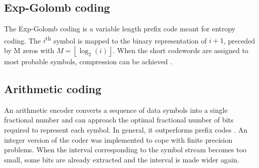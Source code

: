 \subsection{Exp-Golomb coding}

The Exp-Golomb coding is a variable length prefix code meant for entropy coding. The $i$\textsuperscript{th} symbol is mapped to the binary representation of $i+1$, preceded by M zeros with $M=\left \lfloor{\log_2(i)}\right \rfloor $. When the short codewords are assigned to most probable symbols, compression can be achieved \cite{H264}.

\subsection{Arithmetic coding}

An arithmetic encoder converts a sequence of data symbols into a single fractional number and can approach the optimal fractional number of bits required to represent each symbol. In general, it outperforms prefix codes \cite{H264}. An integer version of the coder was implemented to cope with finite precision problems. When the interval corresponding to the symbol stream becomes too small, some bits are already extracted and the interval is made wider again.